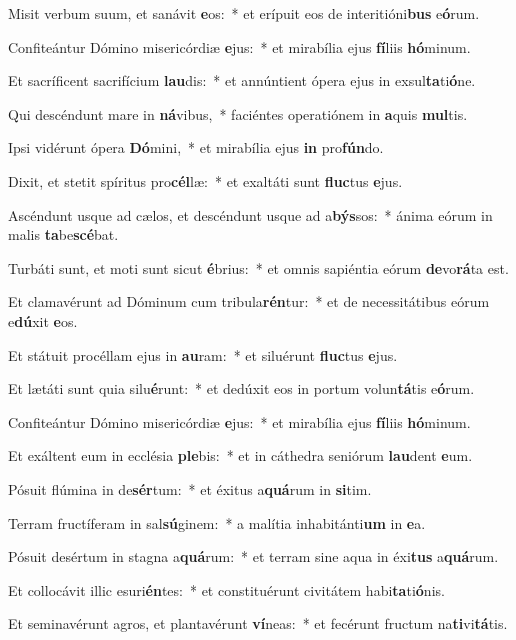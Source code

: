 \item Misit verbum suum, et sanávit \textbf{e}os:~* et erípuit eos de interitióni\textbf{bus} e\textbf{ó}rum.
\item Confiteántur Dómino misericórdiæ \textbf{e}jus:~* et mirabília ejus \textbf{fí}liis \textbf{hó}minum.
\item Et sacríficent sacrifícium \textbf{lau}dis:~* et annúntient ópera ejus in exsul\textbf{ta}ti\textbf{ó}ne.
\item Qui descéndunt mare in \textbf{ná}vibus,~* faciéntes operatiónem in \textbf{a}quis \textbf{mul}tis.
\item Ipsi vidérunt ópera \textbf{Dó}mini,~* et mirabília ejus \textbf{in} pro\textbf{fún}do.
\item Dixit, et stetit spíritus pro\textbf{cél}læ:~* et exaltáti sunt \textbf{fluc}tus \textbf{e}jus.
\item Ascéndunt usque ad cælos, et descéndunt usque ad a\textbf{býs}sos:~* ánima eórum in malis \textbf{ta}be\textbf{scé}bat.
\item Turbáti sunt, et moti sunt sicut \textbf{é}brius:~* et omnis sapiéntia eórum \textbf{de}vo\textbf{rá}ta est.
\item Et clamavérunt ad Dóminum cum tribula\textbf{rén}tur:~* et de necessitátibus eórum e\textbf{dú}xit \textbf{e}os.
\item Et státuit procéllam ejus in \textbf{au}ram:~* et siluérunt \textbf{fluc}tus \textbf{e}jus.
\item Et lætáti sunt quia silu\textbf{é}runt:~* et dedúxit eos in portum volun\textbf{tá}tis e\textbf{ó}rum.
\item Confiteántur Dómino misericórdiæ \textbf{e}jus:~* et mirabília ejus \textbf{fí}liis \textbf{hó}minum.
\item Et exáltent eum in ecclésia \textbf{ple}bis:~* et in cáthedra seniórum \textbf{lau}dent \textbf{e}um.
\item Pósuit flúmina in de\textbf{sér}tum:~* et éxitus a\textbf{quá}rum in \textbf{si}tim.
\item Terram fructíferam in sal\textbf{sú}ginem:~* a malítia inhabitánti\textbf{um} in \textbf{e}a.
\item Pósuit desértum in stagna a\textbf{quá}rum:~* et terram sine aqua in éxi\textbf{tus} a\textbf{quá}rum.
\item Et collocávit illic esuri\textbf{én}tes:~* et constituérunt civitátem habi\textbf{ta}ti\textbf{ó}nis.
\item Et seminavérunt agros, et plantavérunt \textbf{ví}neas:~* et fecérunt fructum na\textbf{ti}vi\textbf{tá}tis.
